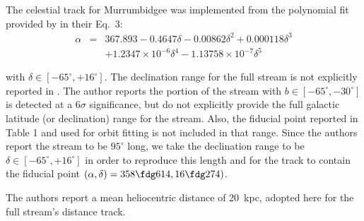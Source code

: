 The celestial track for Murrumbidgee was implemented from the polynomial fit provided by \citet{Grillmair2017_south}
in their Eq.~3:
\begin{eqnarray*}
\alpha &=& 367.893 -0.4647\delta - 0.00862\delta^2 + 0.000118\delta^3 \\
       & & +1.2347\times 10^{-6}\delta^4 - 1.13758\times 10^{-7}\delta^5
\end{eqnarray*}

with $\delta \in [-65^\circ,+16^\circ]$. The declination range for the full stream is not explicitly reported in \citet{Grillmair2017_south}. 
The author reports the portion of the stream with $b \in [-65^\circ,-30^\circ]$ is detected at a 
$6\sigma$ significance, but do not explicitly provide the full galactic latitude (or declination) range for the stream. 
Also, the fiducial point reported in Table 1 and used for orbit fitting is not included in that range. 
Since the authors report the stream to be $95^\circ$ long, we take the declination range to be 
$\delta \in [-65^\circ,+16^\circ]$ in order to reproduce this length and for the track to contain the fiducial point
$(\alpha,\delta)=358\fdg614, 16\fdg274)$.

The authors report a mean heliocentric distance of 20~kpc, adopted here for the full stream's distance track.
